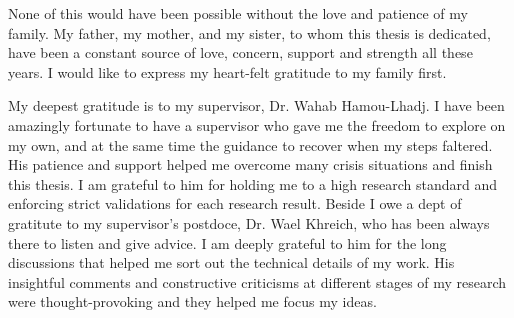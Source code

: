 None of this would have been possible without the love and patience of my family. My father, my mother, and my sister, to whom this thesis is dedicated, have been a constant source of love, concern, support and strength all these years. I would like to express my heart-felt gratitude to my family first. 

My deepest gratitude is to my supervisor, Dr. Wahab Hamou-Lhadj. I have been amazingly fortunate to have a supervisor who gave me the freedom to explore on my own, and at the same time the guidance to recover when my steps faltered. His patience and support helped me overcome many crisis situations and finish this thesis. I am grateful to him for holding me to a high research standard and enforcing strict validations for each research result. Beside I owe a dept of gratitute to my supervisor's postdoce, Dr. Wael Khreich, who has been always there to listen and give advice. I am deeply grateful to him for the long discussions that helped me sort out the technical details of my work. His insightful comments and constructive criticisms at different stages of my research were thought-provoking and they helped me focus my ideas.



